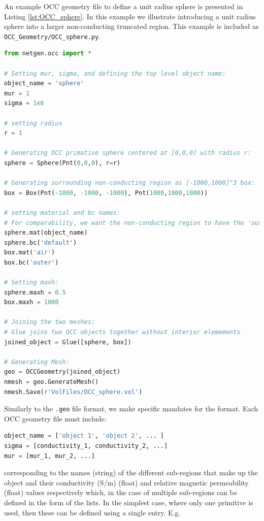 \noindent
An example OCC geometry file to define a unit radius sphere is presented in Listing \ref{lst:OCC_sphere}. In this example we illustrate introducing a unit radius sphere into a larger non-conducting truncated region. This example is included as \texttt{OCC\_Geometry/OCC\_sphere.py}.

\begin{lstlisting}[language=Python, caption={OCC description for a unit radius sphere inside a larger truncated non-conducting region.}, label={lst:OCC_sphere}]
from netgen.occ import *

# Setting mur, sigma, and defining the top level object name:
object_name = 'sphere'
mur = 1
sigma = 1e6

# setting radius
r = 1

# Generating OCC primative sphere centered at [0,0,0] with radius r:
sphere = Sphere(Pnt(0,0,0), r=r)

# Generating surrounding non-conducting region as [-1000,1000]^3 box:
box = Box(Pnt(-1000, -1000, -1000), Pnt(1000,1000,1000))

# setting material and bc names:
# For comparability, we want the non-conducting region to have the 'outer' boundary condition and be labelled as 'air'
sphere.mat(object_name)
sphere.bc('default')
box.mat('air')
box.bc('outer')

# Setting maxh:
sphere.maxh = 0.5
box.maxh = 1000

# Joining the two meshes:
# Glue joins two OCC objects together without interior elemements
joined_object = Glue([sphere, box])

# Generating Mesh:
geo = OCCGeometry(joined_object)
nmesh = geo.GenerateMesh()
nmesh.Save(r'VolFiles/OCC_sphere.vol')
\end{lstlisting}

Similarly to the \texttt{.geo} file format, we make specific mandates for the format. Each OCC geometry file must include:
\begin{lstlisting}[language=Python]
object_name = ['object 1', 'object 2', ... ]
sigma = [conductivity_1, conductivity_2, ...]
mur = [mur_1, mur_2, ...]
\end{lstlisting}
corresponding to the names (string) of the different sub-regions that make up the object and their conductivity (S/m) (float) and relative magnetic permeability (float) values respectively which, in the case of multiple sub-regions can be defined in the form of the lists. In the simplest case, where only one primitive is used, then these can be defined using a single entry. E.g.

